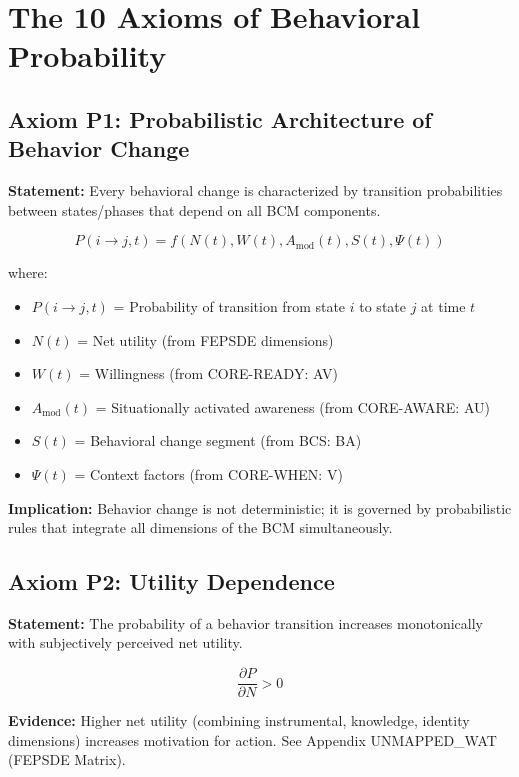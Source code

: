 \documentclass[11pt, a4paper]{article}
\begin{document}
\section{The 10 Axioms of Behavioral Probability}

\subsection{Axiom P1: Probabilistic Architecture of Behavior Change}

\textbf{Statement:} Every behavioral change is characterized by transition probabilities between states/phases that depend on all BCM components.

\begin{equation}
P(i \to j, t) = f(N(t), W(t), A_{\text{mod}}(t), S(t), \Psi(t))
\end{equation}

where:
\begin{itemize}[nosep]
    \item $P(i \to j, t)$ = Probability of transition from state $i$ to state $j$ at time $t$
    \item $N(t)$ = Net utility (from FEPSDE dimensions)
    \item $W(t)$ = Willingness (from CORE-READY: AV)
    \item $A_{\text{mod}}(t)$ = Situationally activated awareness (from CORE-AWARE: AU)
    \item $S(t)$ = Behavioral change segment (from BCS: BA)
    \item $\Psi(t)$ = Context factors (from CORE-WHEN: V)
\end{itemize}

\textbf{Implication:} Behavior change is not deterministic; it is governed by probabilistic rules that integrate all dimensions of the BCM simultaneously.

\subsection{Axiom P2: Utility Dependence}

\textbf{Statement:} The probability of a behavior transition increases monotonically with subjectively perceived net utility.

\begin{equation}
\frac{\partial P}{\partial N} > 0
\end{equation}

\textbf{Evidence:} Higher net utility (combining instrumental, knowledge, identity dimensions) increases motivation for action. See Appendix UNMAPPED_WAT (FEPSDE Matrix).
\end{document}
